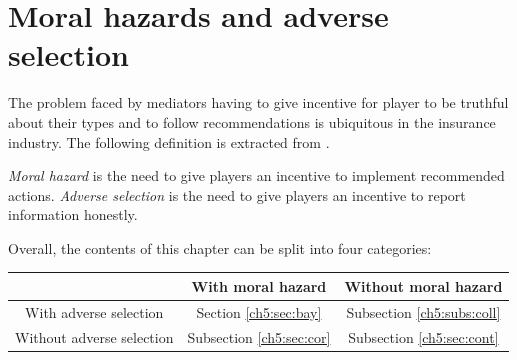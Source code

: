 \section{Moral hazards and adverse selection}

The problem faced by mediators having to give incentive for player to be truthful about their types and to follow recommendations is ubiquitous in the insurance industry. The following definition is extracted from \cite[p. 263]{MyGTAO}.
\begin{definition}
\emph{Moral hazard} is the need to give players an incentive to implement recommended actions.
\emph{Adverse selection} is the need to give players an incentive to report information honestly.
\end{definition}

  Overall, the contents of this chapter can be split into four categories:

  \begin{tabular}{c | c | c}
  & With moral hazard & Without moral hazard \\
  \hline
  With adverse selection   & Section \ref{ch5:sec:bay} &  Subsection \ref{ch5:subs:coll} \\
  \hline
  Without adverse selection  & Subsection \ref{ch5:sec:cor}  & Subsection \ref{ch5:sec:cont} \\
  \end{tabular}








\ifx \globalmark \undefined %


	
\else

\fi

